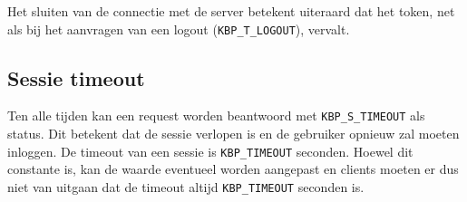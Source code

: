 \documentclass[11pt,a4paper]{article}
\begin{document}
Het sluiten van de connectie met de server betekent uiteraard dat het token, net
als bij het aanvragen van een logout (\texttt{KBP\_T\_LOGOUT}), vervalt.

\subsection{Sessie timeout}
Ten alle tijden kan een request worden beantwoord met \texttt{KBP\_S\_TIMEOUT}
als status. Dit betekent dat de sessie verlopen is en de gebruiker opnieuw zal
moeten inloggen. De timeout van een sessie is \texttt{KBP\_TIMEOUT} seconden.
Hoewel dit constante is, kan de waarde eventueel worden aangepast en clients
moeten er dus niet van uitgaan dat de timeout altijd \texttt{KBP\_TIMEOUT}
seconden is.
\end{document}
